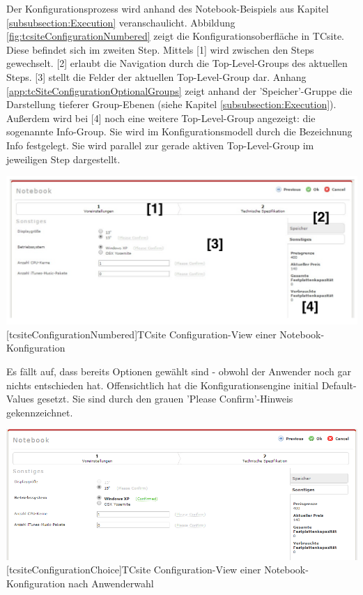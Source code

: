 \documentclass[11pt, a4paper, titlepage, listof=totoc, bibliography=totoc, index=totoc, twoside, openright, headings=normal]{scrreprt}
\begin{document}
Der Konfigurationsprozess wird anhand des Notebook-Beispiels aus Kapitel \ref{subsubsection:Execution} veranschaulicht. Abbildung \ref{fig:tcsiteConfigurationNumbered} zeigt die Konfigurationsoberfläche in TCsite. Diese befindet sich im zweiten Step. Mittels [1] wird zwischen den Steps gewechselt. [2] erlaubt die Navigation durch die Top-Level-Groups des aktuellen Steps. [3] stellt die Felder der aktuellen Top-Level-Group dar. Anhang \ref{app:tcSiteConfigurationOptionalGroups} zeigt anhand der 'Speicher'-Gruppe die Darstellung tieferer Group-Ebenen (siehe Kapitel \ref{subsubsection:Execution}). Außerdem wird bei [4] noch eine weitere Top-Level-Group angezeigt: die sogenannte Info-Group. Sie wird im Konfigurationsmodell durch die Bezeichnung \glqq Info\grqq{} festgelegt. Sie wird parallel zur gerade aktiven Top-Level-Group im jeweiligen Step dargestellt.

\vspace{1em}
\begin{minipage}{\linewidth}
	\centering
	\includegraphics[width=1\linewidth]{Abbildungen/tcsiteConfigurationNumbered.pdf}
	[tcsiteConfigurationNumbered]{TCsite Configuration-View einer Notebook-Konfiguration}
	\label{fig:tcsiteConfigurationNumbered}
\end{minipage}
\vspace{1em}

Es fällt auf, dass bereits Optionen gewählt sind - obwohl der Anwender noch gar nichts entschieden hat. Offensichtlich hat die Konfigurationsengine initial Default-Values gesetzt. Sie sind durch den grauen 'Please Confirm'-Hinweis gekennzeichnet.

\vspace{1em}
\begin{minipage}{\linewidth}
	\centering
	\includegraphics[width=1\linewidth]{Abbildungen/tcsiteConfigurationChoice.PNG}
	[tcsiteConfigurationChoice]{TCsite Configuration-View einer Notebook-Konfiguration nach Anwenderwahl}
	\label{fig:tcsiteConfigurationChoice}
\end{minipage}
\vspace{1em}
\end{document}
